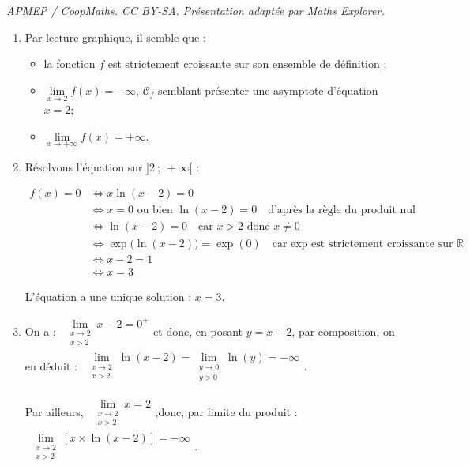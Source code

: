 \documentclass[10pt]{article}
\providecommand{\R}{\mathbb{R}}
\begin{document}
\noindent\textit{APMEP / CoopMaths. CC BY-SA. Présentation adaptée par Maths Explorer.}\par\medskip
\begin{enumerate}
	\item Par lecture graphique, il semble que :
	\begin{itemize}
		\item la fonction $f$ est strictement croissante sur son ensemble de définition ;
		\item $\lim\limits_{x \to 2} f(x) = -\infty$, $\mathcal{C}_f$ semblant présenter une asymptote d'équation $x = 2$;
		\item $\lim\limits_{x \to +\infty} f(x) = +\infty$.
	\end{itemize}

	\item Résolvons l'équation sur $]2~;~+\infty[$ :

$\begin{aligned}
		f(x) = 0&\iff x\ln(x- 2) = 0\\
		& \iff x = 0 \text{ ou bien } \ln(x-2) = 0\quad \text{d'après la règle du produit nul}\\
		& \iff \ln(x-2) = 0\quad \text{car } x > 2\text{ donc } x\neq 0\\
		& \iff \exp\big(\ln(x-2)\big) = \exp(0)\quad \text{car exp est strictement croissante sur }\R\\
		& \iff x-2 = 1\\
		&\iff x = 3
\end{aligned}$

	L'équation a une unique solution : $x = 3$.

	\item On a : \quad $\begin{gathered}\lim\limits_{\substack{x \to 2\\x > 2}} x - 2 = 0^{+}\end{gathered}$\quad et donc, en posant $y = x - 2$, par composition, on en déduit :
	 $\begin{gathered}\lim\limits_{\substack{x \to 2\\x > 2}} \ln(x - 2) = \lim\limits_{\substack{y \to 0\\y > 0}} \ln(y) = -\infty\end{gathered}$.

Par ailleurs, \quad $\begin{gathered}\lim\limits_{\substack{x \to 2\\x > 2}} x = 2\end{gathered}$,\quad donc, par limite du produit : \quad $\begin{gathered}\lim\limits_{\substack{x \to 2\\x > 2}}[ x\times \ln(x-2)] = -\infty \end{gathered}$.


\end{enumerate}
\end{document}
